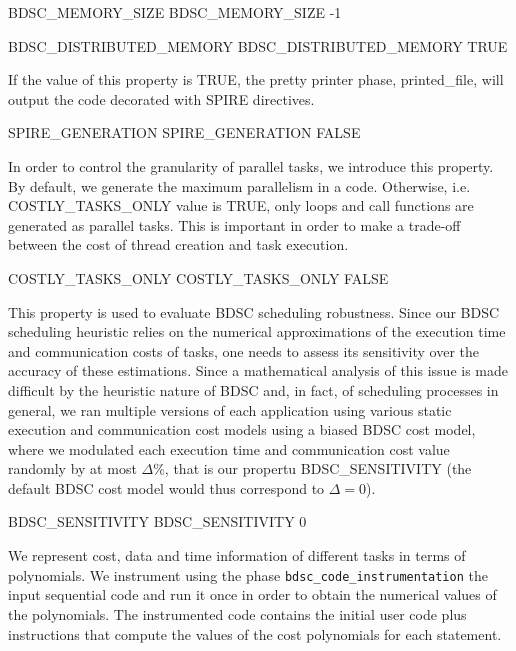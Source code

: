 \documentclass[a4paper]{report}
\newenvironment{PipsPass}[1]{\label{pass:#1}}{}
\begin{document}
\begin{PipsProp}{BDSC_MEMORY_SIZE}
BDSC_MEMORY_SIZE -1
\end{PipsProp}

\begin{PipsProp}{BDSC_DISTRIBUTED_MEMORY}
BDSC_DISTRIBUTED_MEMORY TRUE
\end{PipsProp}

If the value of this property is TRUE, the pretty printer phase,
printed\_file, will output the code decorated with SPIRE directives.

\begin{PipsProp}{SPIRE_GENERATION}
SPIRE_GENERATION FALSE
\end{PipsProp}



In order to control the granularity of parallel tasks, we introduce
this property. By default, we generate the maximum parallelism in a
code. Otherwise, i.e. COSTLY\_TASKS\_ONLY value is TRUE, only loops and call
functions are generated as parallel tasks. This is important in order
to make a trade-off between the cost of thread creation and task execution.    
\begin{PipsProp}{COSTLY_TASKS_ONLY}
COSTLY_TASKS_ONLY FALSE
\end{PipsProp}

This property is used to evaluate BDSC scheduling robustness. Since
our BDSC scheduling heuristic relies on the numerical approximations
of the execution time and communication costs of tasks, one needs to
assess its sensitivity over the accuracy of these estimations. Since a
mathematical analysis of this issue is made difficult by the heuristic
nature of BDSC and, in fact, of scheduling processes in general, we
ran multiple versions of each application using various static
execution and communication cost models using a biased BDSC cost
model, where we modulated each execution time and communication cost
value randomly by at most $\Delta$\%, that is our propertu BDSC\_SENSITIVITY (the default BDSC cost model would thus correspond to $\Delta = 0$).
\begin{PipsProp}{BDSC_SENSITIVITY}
BDSC_SENSITIVITY 0
\end{PipsProp}

\begin{PipsPass}{bdsc_code_instrumentation}
We represent cost, data and time information of different tasks in
terms of polynomials. We instrument using the phase \texttt{bdsc\_code\_instrumentation} the input sequential code and run
it once in order to obtain the numerical values of the polynomials.
The instrumented code contains the initial user code plus instructions
that compute the values of the cost polynomials for each statement.
\end{PipsPass}
\end{document}
